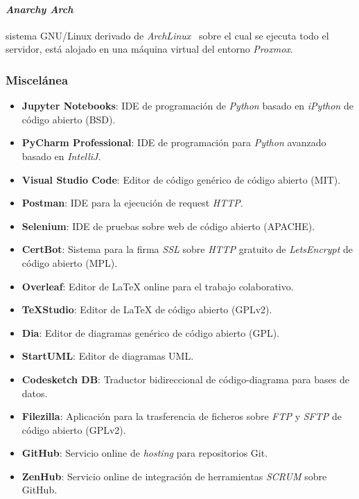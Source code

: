\paragraph{\textit{Anarchy Arch}}sistema GNU/Linux derivado de \textit{ArchLinux}~\cite{wiki:arch} sobre el cual se ejecuta todo el servidor, está alojado en una máquina virtual del entorno \textit{Proxmox}.

\subsubsection{Miscelánea}
\begin{itemize}
	\item \textbf{Jupyter Notebooks}: IDE de programación de \textit{Python} basado en \textit{iPython} de código abierto (BSD).
	\item \textbf{PyCharm Professional}: IDE de programación para \textit{Python} avanzado basado en \textit{IntelliJ}.
	\item \textbf{Visual Studio Code}: Editor de código genérico de código abierto (MIT).
	\item \textbf{Postman}: IDE para la ejecución de request \textit{HTTP}.
	\item \textbf{Selenium}: IDE de pruebas sobre web de código abierto (APACHE).
	\item \textbf{CertBot}: Sistema para la firma \textit{SSL} sobre \textit{HTTP} gratuito de \textit{LetsEncrypt} de código abierto (MPL).
	\item \textbf{Overleaf}: Editor de \LaTeX{} online para el trabajo colaborativo.
	\item \textbf{\TeX{}Studio}: Editor de \LaTeX{} de código abierto (GPLv2).
	\item \textbf{Dia}: Editor de diagramas genérico de código abierto (GPL).
	\item \textbf{StartUML}: Editor de diagramas UML.
	\item \textbf{Codesketch DB}: Traductor bidireccional de código-diagrama para bases de datos.
	\item \textbf{Filezilla}: Aplicación para la trasferencia de ficheros sobre \textit{FTP} y \textit{SFTP} de código abierto (GPLv2).
	\item \textbf{GitHub}: Servicio online de \textit{hosting} para repositorios Git.
	\item \textbf{ZenHub}: Servicio online de integración de herramientas \textit{SCRUM} sobre GitHub.
\end{itemize}